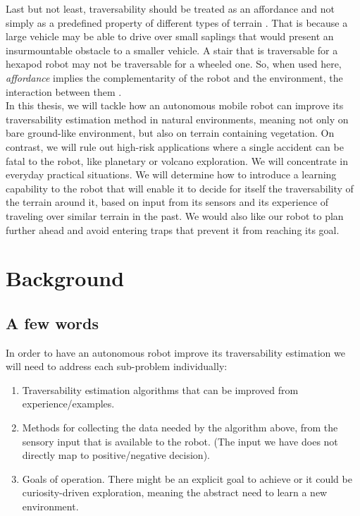 \documentclass[12pt,a4paper]{report}
\newcommand{\term}{\textit}
\begin{document}
	Last but not least, traversability should be treated as an affordance and 
	not simply as a predefined property of different types of terrain \cite{Kim}. 
	That is because a large vehicle may be able to drive over small saplings that 
	would present an insurmountable obstacle to a smaller vehicle. A stair that is 
	traversable for a hexapod robot may not be traversable for a wheeled one. So, 
	when used here, \term{affordance} implies the complementarity of the robot and 
	the environment, the interaction between them \cite{Ugur}.
	\\
	
	In this thesis, we will tackle how an autonomous mobile robot can improve its 
	traversability estimation method in natural environments, meaning not 
	only on bare ground-like environment, but also on terrain containing vegetation. 
	On contrast, we will rule out high-risk applications where a single accident can 
	be fatal to the robot, like planetary or volcano exploration. We will concentrate 
	in everyday practical situations. We will determine how to introduce a learning 
	capability to the robot that will enable it to decide for itself the 
	traversability of the terrain around it, based on input from its sensors 
	and its experience of traveling over similar terrain in the past. We would also 
	like our robot to plan further ahead and avoid entering traps that prevent it 
	from reaching its goal.
	\\
	
	\chapter{Background}
	\label{sec:bg}
	
	\section{A few words}
	\label{sec:bg:intro}
	
	In order to have an autonomous robot improve its traversability 
	estimation we will need to address each sub-problem individually:
	
	\begin{enumerate}
		\item Traversability estimation algorithms that can be improved from 
		experience/examples.
		\item Methods for collecting the data needed by the algorithm above, from 
		the sensory input that is available to the robot. (The input we have does not 
		directly map to positive/negative decision).
		\item Goals of operation. There might be an explicit goal to achieve or it 
		could be curiosity-driven exploration, meaning the abstract need to learn a 
		new environment.
	\end{enumerate}
	
\end{document}
